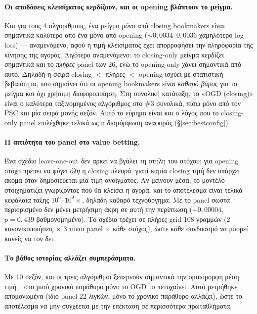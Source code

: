 \documentclass[11pt,a4paper]{article}
\renewcommand{\_}{\oldunderscore\allowbreak}
\begin{document}
\paragraph{Οι αποδόσεις κλεισίματος κερδίζουν, και οι opening βλάπτουν το μείγμα.} Και για
τους 4 αλγορίθμους, ένα μείγμα \emph{μόνο} από closing bookmakers είναι σημαντικά καλύτερο
από ένα μόνο από opening ($\sim0{,}0034$--$0{,}0036$ χαμηλότερο log-loss) --- αναμενόμενο,
αφού η τιμή κλεισίματος έχει απορροφήσει την πληροφορία της κίνησης της αγοράς. Λιγότερο
αναμενόμενο: το closing-only μείγμα κερδίζει σημαντικά και το \emph{πλήρες} panel των 26,
ενώ το opening-only χάνει σημαντικά από αυτό. Δηλαδή η σειρά closing $<$ πλήρες $<$ opening
ισχύει με στατιστική βεβαιότητα, που σημαίνει ότι οι opening bookmakers είναι \emph{καθαρό
βάρος} για το μείγμα και όχι χρήσιμη διαφοροποίηση. Στη συνολική κατάταξη, το «OGD
(closing)» είναι ο καλύτερα ταξινομημένος αλγόριθμος στο \#3 συνολικά, πίσω μόνο από τον PSC
και μία σειρά μονής σεζόν. Αυτό το εύρημα είναι και ο λόγος που το closing-only panel
επιλέχθηκε τελικά ως η διαμόρφωση αναφοράς (\S\ref{sec:bestconfig}).

\paragraph{Η αιτιότητα του panel στο value betting.} Ένα σχέδιο leave-one-out δεν αρκεί να
βγάλει τη στήλη του στόχου: για opening στόχο πρέπει να φύγει \emph{όλη} η closing πλευρά,
γιατί καμία closing τιμή δεν υπάρχει ακόμα όταν δημοσιεύεται μια τιμή ανοίγματος. Αν μείνουν
μέσα, το μοντέλο στοιχηματίζει γνωρίζοντας πού θα κλείσει η αγορά, και το αποτέλεσμα είναι
τελικά κεφάλαια τάξης $10^6$--$10^9\times$, δηλαδή καθαρό τεχνούργημα. Με το panel σωστά
περιορισμένο δεν μένει μετρήσιμη άκρη σε αυτή την περίπτωση ($+0{,}00004$, $p=0{,}439$
βαθμονομημένο). Το σχέδιο τρέχει σε πλήρες grid 108 γραμμών (2 κανονικοποιήσεις $\times$ 3
τύποι panel $\times$ κάθε στόχος), ώστε κάθε συνδυασμό να μπορεί κανείς να τον δει.

\paragraph{Το βάθος ιστορίας αλλάζει συμπεράσματα.} Με 10 σεζόν, και οι τρεις αλγόριθμοι
ξεπερνούν σημαντικά την ομοιόμορφη μέση τιμή· στο μισό χρονικό παράθυρο μόνο το OGD το
πετυχαίνει. Αυτό μετρήθηκε απομονωμένα (ίδιο panel 22 λιγκών, μόνο το χρονικό παράθυρο
αλλάζει), ώστε το αποτέλεσμα να μην συγχέεται με την επέκταση σε περισσότερα πρωταθλήματα.
\end{document}
